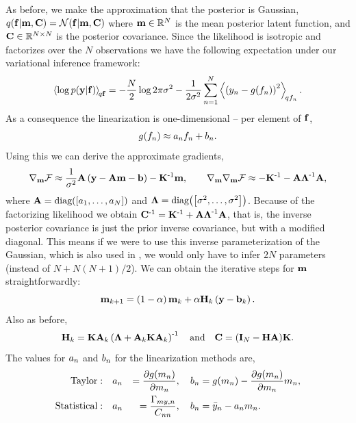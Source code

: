 \documentclass{article} %
\begin{document}
As before, we make the approximation that the posterior is Gaussian,
$\qrobC{\lstate}{\pomean, \pocov} = \gausC{\lstate}{\pomean, \pocov}$ where
$\pomean \in \real{N}$ is the mean posterior latent function, and $\pocov \in
\real{N \times N}$ is the posterior covariance. Since the likelihood is
isotropic and factorizes over the $N$  observations 
we have the following expectation under
our variational inference framework:
\begin{equation*}
    \expec{q\lstate}{\log\probC{\obs}{\lstate}} =
        - \frac{N}{2}\log{2\pi\lvar}
        - \frac{1}{2\lvar} \sum_{n=1}^N 
            \expec{q\lstates_n}{\brac{\obss_n - \nonlin{\lstates_n}}^2}.
\end{equation*}
As a consequence the linearization is one-dimensional -- per element of 
$\lstate$,
\begin{equation}
    \nonlin{\lstates_n} \approx \Lins_n\lstates_n + \intcpts_n.
\end{equation}
Using this we can derive the approximate gradients,
\begin{equation}
    \nabla_\pomean\Fengy \approx \frac{1}{\lvar}\Linmat\brac{\obs -
        \Linmat\pomean - \intcpt} - \KERNL\inv\pomean,
    \qquad
    \nabla_\pomean\nabla_\pomean \Fengy \approx -\KERNL\inv
    -\Linmat\Lvar\inv\Linmat,
\end{equation}
where $\Linmat = \diag{\sbrac{\Lins_1, \ldots, \Lins_N}}$ and $\Lvar =
\diag{\sbrac{\lvar, \ldots, \lvar}}$. Because of the factorizing likelihood we
obtain $\pocov\inv = \KERNL\inv + \Linmat\Lvar\inv\Linmat$, that is, the
inverse posterior covariance is just the prior inverse covariance, but with a
modified diagonal. This means if we were to use this inverse parameterization
of the Gaussian, which is also used in \cite{Opper2009}, we would
 only have to infer $2N$ parameters (instead of $N + N(N+1)/2$).
 We can obtain the iterative steps for $\pomean$ straightforwardly:
\begin{equation}
    \pomean_{k+1} = \brac{1-\step}\pomean_k 
        + \step\Kgain_k\brac{\obs - \intcpt_k}.
    \label{eq:pomeangp}
\end{equation}
Also as before,
\begin{equation}
    \Kgain_k = \KERNL\Linmat_k\brac{\Lvar + \Linmat_k\KERNL\Linmat_k}\inv
    \quad \text{and} \quad
    \pocov = \brac{\ident{N} - \Kgain\Linmat}\!\KERNL.
    \label{eq:pocovgp}
\end{equation}
The values for $\Lins_n$ and $\intcpts_n$ for the linearization methods are,
\begin{alignat}{3}
    \text{Taylor}:&\quad
        \Lins_n &= \frac{\partial\nonlin{\pomeans_n}}{\partial\pomeans_n},
        \quad
        \intcpts_n &= \nonlin{\pomeans_n}
        - \frac{\partial\nonlin{\pomeans_n}}{\partial\pomeans_n} \pomeans_n, \\
    \text{Statistical}:&\quad
        \Lins_n &= \frac{\xcovs_{\pomeans\obss,n}}{\pocovs_{nn}},
        \quad
        \intcpts_n &= \bar\obss_n - \Lins_n\pomeans_n.
\end{alignat}
\end{document}
